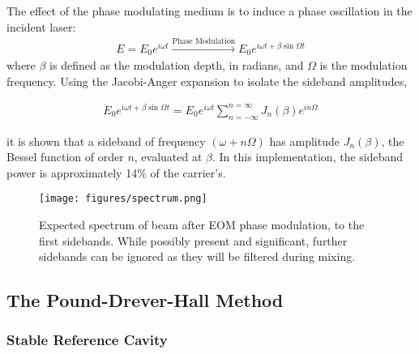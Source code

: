 The effect of the phase modulating medium is to induce a phase oscillation in the incident laser:
\begin{gather}
  E = E_0 e^{i\omega t} \xrightarrow{\mbox{Phase Modulation}}
    E_0 e^{i \omega t + \beta \sin \Omega t}
\end{gather}
where $\beta$ is defined as the modulation depth, in radians, and $\Omega$ is the modulation frequency. Using the Jacobi-Anger expansion to isolate the sideband amplitudes,

\begin{gather}
  E_0 e^{i \omega t + \beta \sin \Omega t}  =
  E_0 e^{i\omega t} \sum_{n = -\infty}^{n = \infty} J_n(\beta)e^{in\Omega}
\end{gather}

it is shown that a sideband of frequency $(\omega +n\Omega)$ has amplitude $J_n(\beta)$, the Bessel function of order $n$, evaluated at $\beta$. In this implementation, the sideband power is approximately 14\% of the carrier's.

\begin{figure}
  \centering
  \texttt{[image: figures/spectrum.png]}
  \caption{Expected spectrum of beam after EOM phase modulation, to the first
  sidebands. While possibly present and significant, further sidebands can
  be ignored as they will be filtered during mixing.}
  \label{fig:eom_spectrum}
\end{figure}


\subsection{The Pound-Drever-Hall Method}

\subsubsection{Stable Reference Cavity}

